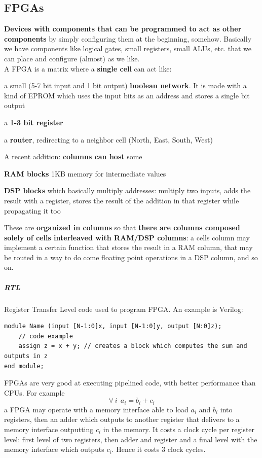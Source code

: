 \documentclass[10pt]{report}
\begin{document}
\subsection{FPGAs}
\textbf{Devices with components that can be programmed to act as other components} by simply configuring them at the beginning, somehow. Basically we have components like logical gates, small registers, small ALUs, etc. that we can place and configure (almost) as we like.\\
A FPGA is a matrix where a \textbf{single cell} can act like:
\begin{list}{}{}
	\item a small (5-7 bit input and 1 bit output) \textbf{boolean network}. It is made with a kind of EPROM which uses the input bits as an address and stores a single bit output
	\item a \textbf{1-3 bit register}
	\item a \textbf{router}, redirecting to a neighbor cell (North, East, South, West)
\end{list}
A recent addition: \textbf{columns can host} some
\begin{list}{}{}
	\item \textbf{RAM blocks} 1KB memory for intermediate values
	\item \textbf{DSP blocks} which basically multiply addresses: multiply two inputs, adds the result with a register, stores the result of the addition in that register while propagating it too
\end{list}
These are \textbf{organized in columns} so that \textbf{there are columns composed solely of cells interleaved with RAM/DSP columns}: a cells column may implement a certain function that stores the result in a RAM column, that may be routed in a way to do come floating point operations in a DSP column, and so on.
\subparagraph{RTL} Register Transfer Level code used to program FPGA. An example is Verilog:
\begin{lstlisting}[style=myC]
module Name (input [N-1:0]x, input [N-1:0]y, output [N:0]z);
	// code example
	assign z = x + y; // creates a block which computes the sum and outputs in z
end module;
\end{lstlisting}
FPGAs are very good at executing pipelined code, with better performance than CPUs. For example $$\forall\:i\:\:a_i = b_i + c_i$$
a FPGA may operate with a memory interface able to load $a_i$ and $b_i$ into registers, then an adder which outputs to another register that delivers to a memory interface outputting $c_i$ in the memory. It costs a clock cycle per register level: first level of two registers, then adder and register and a final level with the memory interface which outputs $c_i$. Hence it costs 3 clock cycles.\\
\end{document}
